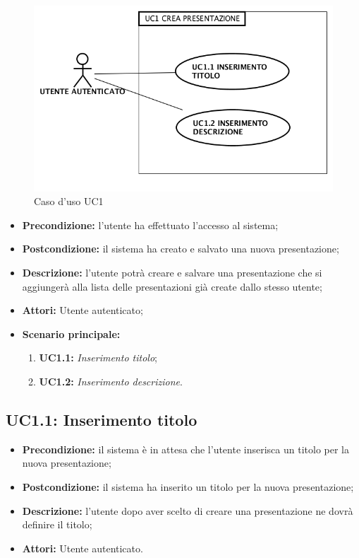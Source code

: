 \begin{figure}[h]
	\begin{center}
	\includegraphics[scale=0.4]{diagram/UC1.png}
	\caption{Caso d'uso UC1}
	\end{center}
\end{figure}
\begin{itemize}
	\item \textbf{Precondizione:} l'utente ha effettuato l'accesso al sistema;
	\item \textbf{Postcondizione:} il sistema ha creato e salvato una nuova presentazione;
	\item \textbf{Descrizione:} l'utente potrà creare e salvare una presentazione che si aggiungerà alla lista delle presentazioni già create dallo stesso utente;
	\item \textbf{Attori:} Utente autenticato;
	\item \textbf{Scenario principale:}
	\begin{enumerate}
		\item \textbf{ UC1.1:} \textit{ Inserimento titolo};
		\item \textbf{ UC1.2:} \textit{ Inserimento descrizione}.
	\end{enumerate}
\end{itemize}
\subsection{ UC1.1: Inserimento titolo}

\begin{itemize}
	\item \textbf{Precondizione:} il sistema è in attesa che l'utente inserisca un titolo per la nuova presentazione;
	\item \textbf{Postcondizione:} il sistema ha inserito un titolo per la nuova presentazione;
	\item \textbf{Descrizione:} l'utente dopo aver scelto di creare una presentazione ne dovrà definire il titolo;
	\item \textbf{Attori:} Utente autenticato.
\end{itemize}

